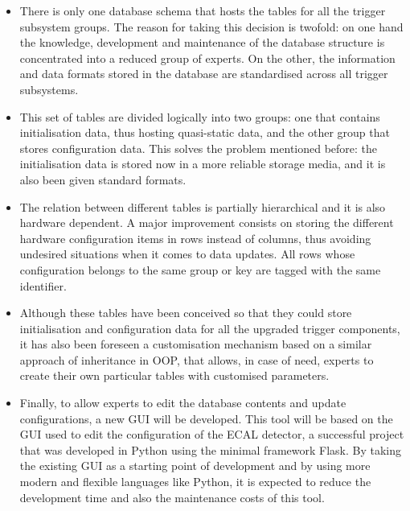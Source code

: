 \documentclass[a4paper]{jpconf}
\begin{document}
\begin{itemize}
  \item There is only one database schema that hosts the tables for all the trigger subsystem groups. The reason for taking this decision is twofold: on one hand the knowledge, development and maintenance of the database structure is concentrated into a reduced group of experts. On the other, the information and data formats stored in the database are standardised across all trigger subsystems.
  \item This set of tables are divided logically into two groups: one that contains initialisation data, thus hosting quasi-static data, and the other group that stores configuration data. This solves the problem mentioned before: the initialisation data is stored now in a more reliable storage media, and it is also been given standard formats. 
  \item The relation between different tables is partially hierarchical and it is also hardware dependent. A major improvement consists on storing the different hardware configuration items in rows instead of columns, thus avoiding undesired situations when it comes to data updates. All rows whose configuration belongs to the same group or key are tagged with the same identifier. 
  
  
  \item Although these tables have been conceived so that they could store initialisation and configuration data for all the upgraded trigger components, it has also been foreseen a customisation mechanism based on a similar approach of inheritance in OOP, that allows, in case of need, experts to create their own particular tables with customised parameters. 

  \item Finally, to allow experts to edit the database contents and update configurations, a new GUI will be developed. This tool will be based on the GUI used to edit the configuration of the ECAL detector, a successful project that was developed in Python using the minimal framework Flask. By taking the existing GUI as a starting point of development and by using more modern and flexible languages like Python, it is expected  to reduce the development time and also the maintenance costs of this tool.

\end{itemize}
\end{document}

